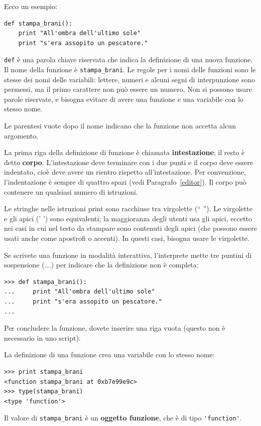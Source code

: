 \documentclass[10pt]{book}
\begin{document}
Ecco un esempio:

\begin{verbatim}
def stampa_brani():
    print "All'ombra dell'ultimo sole"
    print "s'era assopito un pescatore."
\end{verbatim}
%
{\tt def} è una parola chiave riservata che indica la definizione di una nuova funzione. Il nome della funzione è \verb"stampa_brani".  Le regole per i nomi delle funzioni sono le stesse dei nomi delle variabili: lettere, numeri e alcuni segni di interpunzione sono permessi, ma il primo carattere non può essere un numero. Non si possono usare parole riservate, e bisogna evitare di avere una funzione e una variabile con lo stesso nome.

Le parentesi vuote dopo il nome indicano che la funzione non accetta alcun argomento.

La prima riga della definizione di funzione è chiamata {\bf intestazione};
il resto è detto {\bf corpo}. L'intestazione deve terminare con i due punti e il corpo deve essere indentato, cioè deve avere un rientro rispetto all'intestazione. Per convenzione, l'indentazione è sempre di quattro spazi (vedi Paragrafo~\ref{editor}). Il corpo può contenere un qualsiasi numero di istruzioni.

Le stringhe nelle istruzioni print sono racchiuse tra virgolette (`` ''). Le virgolette e gli apici (' ') sono equivalenti; la maggioranza degli utenti usa gli apici, eccetto nei casi in cui nel testo da stampare sono contenuti degli apici (che possono essere usati anche come apostrofi o accenti). In questi casi, bisogna usare le virgolette.

Se scrivete una funzione in modalità interattiva, l'interprete mette tre puntini di sospensione ({\em ...}) per indicare che la definizione non è completa:

\begin{verbatim}
>>> def stampa_brani():
...     print "All'ombra dell'ultimo sole"
...     print "s'era assopito un pescatore."
...
\end{verbatim}
%
Per concludere la funzione, dovete inserire una riga vuota (questo non è necessario in uno script).

La definizione di una funzione crea una variabile con lo stesso nome:

\begin{verbatim}
>>> print stampa_brani
<function stampa_brani at 0xb7e99e9c>
>>> type(stampa_brani)
<type 'function'>
\end{verbatim}
%
Il valore di \verb"stampa_brani" è un {\bf oggetto funzione}, che è di tipo \verb"'function'".
\end{document}
